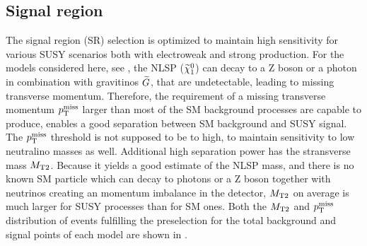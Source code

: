 \subsection{Signal region}\label{sec:SRSelection}
The signal region (SR) selection is optimized to maintain high sensitivity for various SUSY scenarios both with electroweak and strong production. For the models considered here, see , the NLSP ($\widetilde{\chi}^{0}_{1}$) can decay to a Z boson or a photon in   combination with gravitinos $\widetilde{G}$, that are undetectable, leading to missing transverse momentum. Therefore, the requirement of a missing transverse momentum $p_{\mathrm{T}}^\text{miss}$ larger than most of the SM background processes are capable to produce, enables a good separation between SM background and SUSY signal. The $p_{\mathrm{T}}^\text{miss}$ threshold is not supposed to be to high, to maintain sensitivity to low neutralino masses as well.
Additional high separation power has the stransverse mass $M_{\mathrm{T2}}$. Because it yields a good estimate of the NLSP mass, and there is no known SM particle which can decay to photons or a Z boson together with neutrinos creating an momentum imbalance in the detector, $M_{\mathrm{T2}}$ on average is much larger for SUSY processes than for SM ones. Both the $M_{\mathrm{T2}}$ and $p_{\mathrm{T}}^\text{miss}$ distribution of events fulfilling the preselection for the total background and signal points of each model are shown in .
